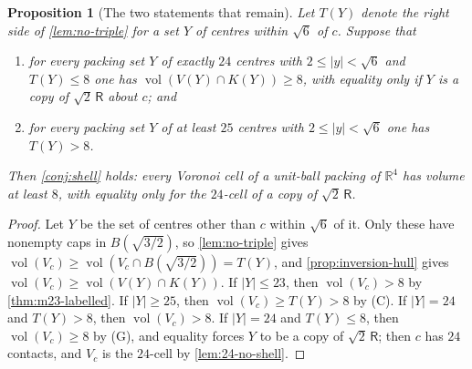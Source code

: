 \documentclass[11pt,reqno]{amsart}
\renewcommand{\_}{\origunderscore\allowbreak}
\numberwithin{equation}{section}
\theoremstyle{plain}
\newtheorem{prop}[thm]{Proposition}
\theoremstyle{definition}
\theoremstyle{remark}
\newcommand{\Rt}{\mathsf{R}}                 %
\DeclareMathOperator{\vol}{vol}
\begin{document}
\begin{prop}[The two statements that remain]\label{prop:reduction-G}
Let $T(Y)$ denote the right side of \cref{lem:no-triple} for a set $Y$ of
centres within $\sqrt6$ of $c$. Suppose that
\begin{enumerate}[leftmargin=2.6em]
\item[\textup{(G)}] for every packing set $Y$ of exactly $24$ centres with
  $2\le|y|<\sqrt6$ and $T(Y)\le8$ one has $\vol(V(Y)\cap K(Y))\ge8$, with
  equality only if $Y$ is a copy of $\sqrt2\,\Rt$ about $c$; and
\item[\textup{(C)}] for every packing set $Y$ of at least $25$ centres with
  $2\le|y|<\sqrt6$ one has $T(Y)>8$.
\end{enumerate}
Then \cref{conj:shell} holds: every Voronoi cell of a unit-ball packing of
$\mathbb{R}^4$ has volume at least $8$, with equality only for the
$24$-cell of a copy of $\sqrt2\,\Rt$.
\end{prop}

\begin{proof}
Let $Y$ be the set of centres other than $c$ within $\sqrt6$ of it. Only
these have nonempty caps in $B(\sqrt{3/2})$, so \cref{lem:no-triple} gives
$\vol(V_c)\ge\vol(V_c\cap B(\sqrt{3/2}))=T(Y)$, and
\cref{prop:inversion-hull} gives $\vol(V_c)\ge\vol(V(Y)\cap K(Y))$. If
$|Y|\le23$, then $\vol(V_c)>8$ by \cref{thm:m23-labelled}. If
$|Y|\ge25$, then $\vol(V_c)\ge T(Y)>8$ by (C). If $|Y|=24$ and
$T(Y)>8$, then $\vol(V_c)>8$. If $|Y|=24$ and $T(Y)\le8$, then
$\vol(V_c)\ge8$ by (G), and equality forces $Y$ to be a copy of
$\sqrt2\,\Rt$; then $c$ has $24$ contacts, and $V_c$ is the $24$-cell by
\cref{lem:24-no-shell}.
\end{proof}
\end{document}
